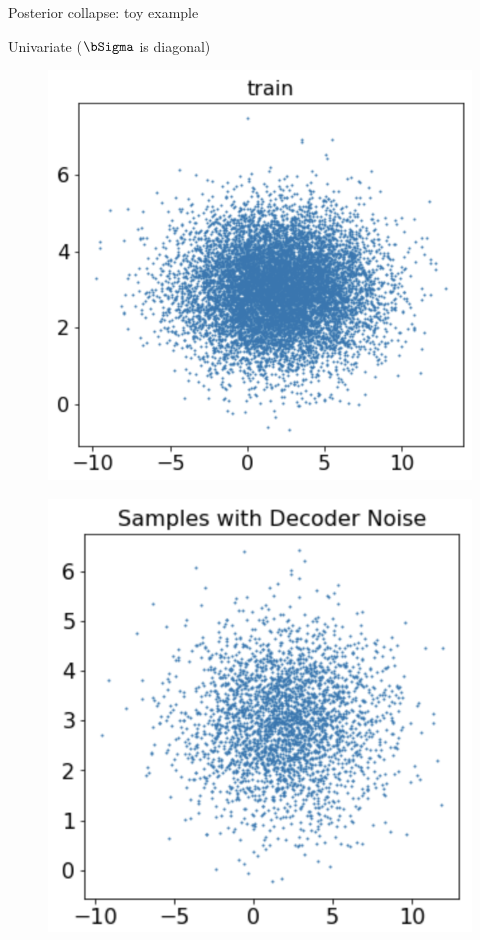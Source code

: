 \begin{frame}{Posterior collapse: toy example}
	\begin{block}{Univariate ($\bSigma$ is diagonal)}
		\vspace{-0.5cm}
		\begin{minipage}[t]{0.33\columnwidth}
		\begin{figure}[h]
			\centering
			\includegraphics[width=.8\linewidth]{figs/posterior_collapse_toy_2.png}
		\end{figure}
		\end{minipage}%
		\begin{minipage}[t]{0.33\columnwidth}
		\begin{figure}[h]
			\centering
			\includegraphics[width=.75\linewidth]{figs/posterior_collapse_toy_4.png}

\end{figure}
\end{minipage}
\end{block}
\end{frame}
